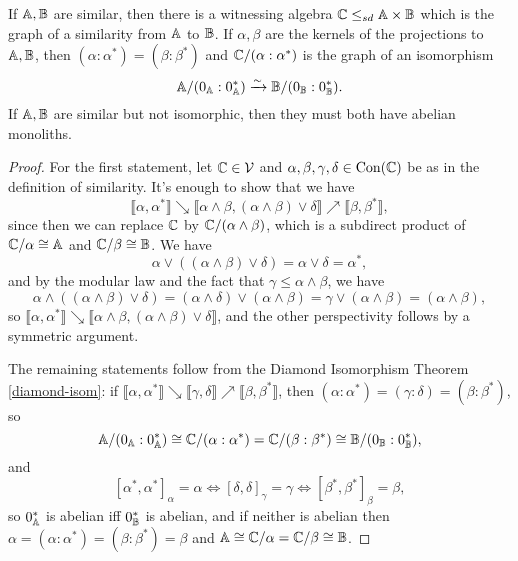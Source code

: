 \documentclass[letterpaper,11pt]{article}
\DeclareMathOperator{\Con}{Con}
\begin{document}
\begin{prop}\label{similarity-graph} If $\mathbb{A}, \mathbb{B}$ are similar, then there is a witnessing algebra $\mathbb{C} \le_{sd} \mathbb{A}\times\mathbb{B}$ which is the graph of a similarity from $\mathbb{A}$ to $\mathbb{B}$. If $\alpha,\beta$ are the kernels of the projections to $\mathbb{A},\mathbb{B}$, then $(\alpha:\alpha^*) = (\beta:\beta^*)$ and $\mathbb{C}/(\alpha:\alpha^*)$ is the graph of an isomorphism
\[
\mathbb{A}/(0_{\mathbb{A}}:0_{\mathbb{A}}^*) \xrightarrow{\sim} \mathbb{B}/(0_{\mathbb{B}}:0_{\mathbb{B}}^*).
\]
If $\mathbb{A}, \mathbb{B}$ are similar but not isomorphic, then they must both have abelian monoliths.
\end{prop}
\begin{proof} For the first statement, let $\mathbb{C} \in \mathcal{V}$ and $\alpha,\beta,\gamma,\delta \in \Con(\bC)$ be as in the definition of similarity. It's enough to show that we have
\[
\llbracket \alpha, \alpha^* \rrbracket \searrow \llbracket \alpha\wedge\beta, (\alpha\wedge\beta)\vee \delta \rrbracket \nearrow \llbracket \beta, \beta^* \rrbracket,
\]
since then we can replace $\mathbb{C}$ by $\mathbb{C}/(\alpha\wedge\beta)$, which is a subdirect product of $\mathbb{C}/\alpha \cong \mathbb{A}$ and $\mathbb{C}/\beta \cong \mathbb{B}$. We have
\[
\alpha \vee ((\alpha\wedge\beta)\vee \delta) = \alpha\vee\delta = \alpha^*,
\]
and by the modular law and the fact that $\gamma \le \alpha \wedge \beta$, we have
\[
\alpha \wedge ((\alpha\wedge\beta)\vee \delta) = (\alpha \wedge \delta) \vee (\alpha \wedge \beta) = \gamma \vee (\alpha \wedge \beta) = (\alpha \wedge \beta),
\]
so $\llbracket \alpha, \alpha^* \rrbracket \searrow \llbracket \alpha\wedge\beta, (\alpha\wedge\beta)\vee \delta \rrbracket$, and the other perspectivity follows by a symmetric argument.

The remaining statements follow from the Diamond Isomorphism Theorem \ref{diamond-isom}: if $\llbracket \alpha, \alpha^* \rrbracket \searrow \llbracket \gamma, \delta \rrbracket \nearrow \llbracket \beta, \beta^* \rrbracket$, then $(\alpha:\alpha^*) = (\gamma:\delta) = (\beta:\beta^*)$, so
\[
\mathbb{A}/(0_{\mathbb{A}}:0_{\mathbb{A}}^*) \cong \mathbb{C}/(\alpha:\alpha^*) = \mathbb{C}/(\beta:\beta^*) \cong \mathbb{B}/(0_{\mathbb{B}}:0_{\mathbb{B}}^*),
\]
and
\[
[\alpha^*,\alpha^*]_\alpha = \alpha \iff [\delta,\delta]_\gamma = \gamma \iff [\beta^*,\beta^*]_\beta = \beta,
\]
so $0_{\mathbb{A}}^*$ is abelian iff $0_{\mathbb{B}}^*$ is abelian, and if neither is abelian then $\alpha = (\alpha:\alpha^*) = (\beta:\beta^*) = \beta$ and $\mathbb{A} \cong \mathbb{C}/\alpha = \mathbb{C}/\beta \cong \mathbb{B}$.
\end{proof}
\end{document}
